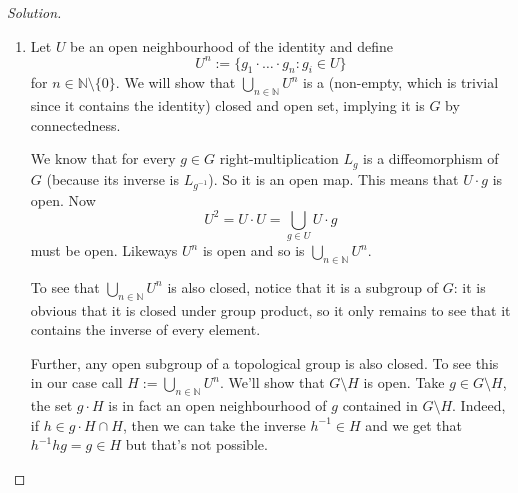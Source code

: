 \begin{proof}[Solution]\leavevmode
	\begin{enumerate}[label=\alph*.]
		\item Let $U$ be an open  neighbourhood of the identity and define
			\[U^n:=\{g_1\cdot\ldots \cdot g_n:g_{i}\in U\}\]
		for $n \in\mathbb{N}\setminus\{0\}$. We will show that $\bigcup_{n \in\mathbb{N}} U^n$ is a (non-empty, which is trivial since it contains the identity) closed and open set, implying it is $G$ by connectedness.

		We know that for every $g\in G$ right-multiplication $L_g$  is a diffeomorphism of $G$ (because its inverse is $L_{g^{-1}}$). So it is an open map. This means that $U\cdot g$ is open. Now
		\[U^2=U\cdot U=\bigcup_{g\in U}U\cdot g \]
		must be open. Likeways $U^n$ is open and so is $\bigcup_{n \in\mathbb{N}} U^n$.

		To see that $\bigcup_{n \in\mathbb{N}} U^n$ is also closed, notice that it is a subgroup of $G$: it is obvious that it is closed under group product, so it only remains to see that it contains the inverse of every element.

		Further, any open subgroup of a topological group is also closed. To see this in our case call $H:=\bigcup_{n \in\mathbb{N}} U^n$. We'll show that $G\setminus H$ is open. Take $g \in G\setminus H$, the set $g\cdot H$ is in fact an open neighbourhood of $g$ contained in $G\setminus H$. Indeed, if $h\in g\cdot H\cap H$, then we can take the inverse $h^{-1}\in H$ and we get that $h^{-1}hg=g\in H$ but that's not possible.




\end{enumerate}
\end{proof}
